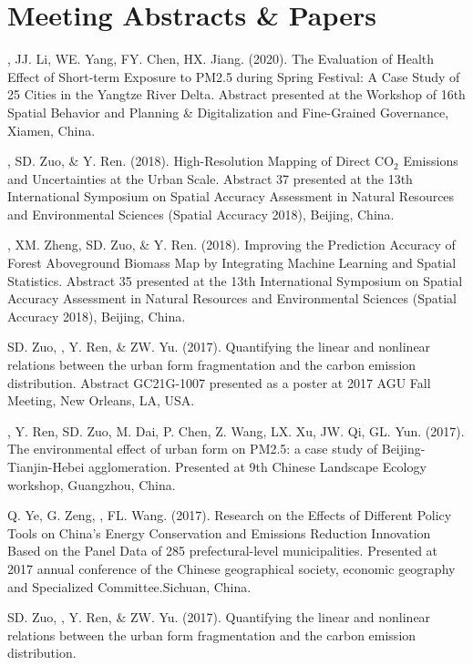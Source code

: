 \section*{Meeting Abstracts \& Papers}
\begin{etaremune}
\item
    \Shaoqing, JJ. Li, WE. Yang, FY. Chen, HX. Jiang. (2020).
    The Evaluation of Health Effect of Short-term Exposure to PM2.5 during Spring Festival: A Case Study of 25 Cities in the Yangtze River Delta.
    Abstract presented at the Workshop of 16th Spatial Behavior and Planning \& Digitalization and Fine-Grained Governance, Xiamen, China.
\item
    \Shaoqing, SD. Zuo, \& Y. Ren. (2018).
    High-Resolution Mapping of Direct CO$_2$ Emissions and Uncertainties at the Urban Scale.
    Abstract 37 presented at the 13th International Symposium on Spatial Accuracy Assessment in Natural Resources and Environmental Sciences (Spatial Accuracy 2018), Beijing, China.
\item
    \Shaoqing\CF, XM. Zheng, SD. Zuo, \& Y. Ren. (2018).
    Improving the Prediction Accuracy of Forest Aboveground Biomass Map by Integrating Machine Learning and Spatial Statistics.
    Abstract 35 presented at the 13th International Symposium on Spatial Accuracy Assessment in Natural Resources and Environmental Sciences (Spatial Accuracy 2018), Beijing, China.
\item
    SD. Zuo, \Shaoqing, Y. Ren, \&  ZW. Yu. (2017).
    Quantifying the linear and nonlinear relations between the urban form fragmentation and the carbon emission distribution.
    Abstract GC21G-1007 presented as a poster at 2017 AGU Fall Meeting, New Orleans, LA, USA.
\item
    \Shaoqing, Y. Ren, SD. Zuo, M. Dai, P. Chen, Z. Wang, LX. Xu, JW. Qi, GL. Yun. (2017).
    The environmental effect of urban form on PM2.5: a case study of Beijing-Tianjin-Hebei agglomeration.
    Presented at 9th Chinese Landscape Ecology workshop, Guangzhou, China.
\item
    Q. Ye, G. Zeng, \Shaoqing, FL. Wang. (2017).
     Research on the Effects of Different Policy Tools on China's Energy Conservation and Emissions Reduction Innovation Based on the Panel Data of 285 prefectural-level municipalities.
     Presented at 2017 annual conference of the Chinese geographical society, economic geography and Specialized Committee.Sichuan, China.
\item
    SD. Zuo, \Shaoqing, Y. Ren, \&  ZW. Yu. (2017).
    Quantifying the linear and nonlinear relations between the urban form fragmentation and the carbon emission distribution.

\end{etaremune}
